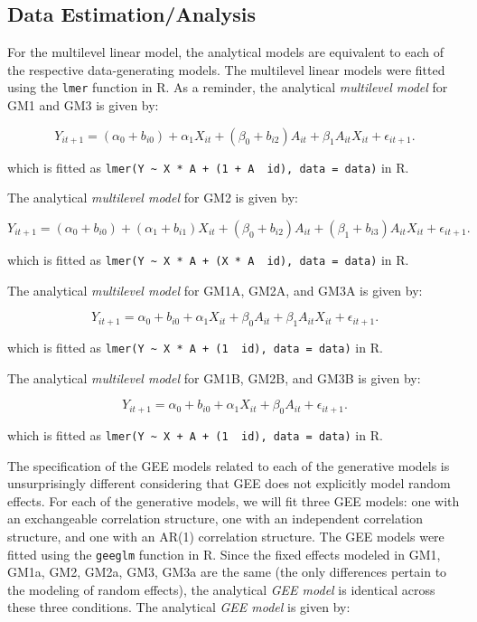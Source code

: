 \documentclass[
  12pt,
  a4paper,
]{article}
\begin{document}
\subsection{Data Estimation/Analysis}\label{data-estimationanalysis}

For the multilevel linear model, the analytical models are equivalent to
each of the respective data-generating models. The multilevel linear
models were fitted using the \texttt{lmer} function in R. As a reminder,
the analytical \emph{multilevel model} for GM1 and GM3 is given by:

\[
Y_{it+1} = (\alpha_0 + b_{i0}) + \alpha_1 X_{it} + (\beta_0 + b_{i2}) A_{it} + \beta_1 A_{it} X_{it} + \epsilon_{it+1}.
\]

which is fitted as
\texttt{lmer(Y\ \textasciitilde{}\ X\ *\ A\ +\ (1\ +\ A\ \textbar{}\ id),\ data\ =\ data)}
in R.

The analytical \emph{multilevel model} for GM2 is given by:

\[
Y_{it+1} = (\alpha_0 + b_{i0}) + (\alpha_1 + b_{i1}) X_{it} + (\beta_0 + b_{i2}) A_{it} + (\beta_1 + b_{i3}) A_{it} X_{it} + \epsilon_{it+1}.
\]

which is fitted as
\texttt{lmer(Y\ \textasciitilde{}\ X\ *\ A\ +\ (X\ *\ A\ \textbar{}\ id),\ data\ =\ data)}
in R.

The analytical \emph{multilevel model} for GM1A, GM2A, and GM3A is given
by:

\[
Y_{it+1} = \alpha_0 + b_{i0} + \alpha_1 X_{it} + \beta_0 A_{it} + \beta_1 A_{it} X_{it} + \epsilon_{it+1}.
\]

which is fitted as
\texttt{lmer(Y\ \textasciitilde{}\ X\ *\ A\ +\ (1\ \textbar{}\ id),\ data\ =\ data)}
in R.

The analytical \emph{multilevel model} for GM1B, GM2B, and GM3B is given
by:

\[
Y_{it+1} = \alpha_0 + b_{i0} + \alpha_1 X_{it} + \beta_0 A_{it} + \epsilon_{it+1}.
\]

which is fitted as
\texttt{lmer(Y\ \textasciitilde{}\ X\ +\ A\ +\ (1\ \textbar{}\ id),\ data\ =\ data)}
in R.

The specification of the GEE models related to each of the generative
models is unsurprisingly different considering that GEE does not
explicitly model random effects. For each of the generative models, we
will fit three GEE models: one with an exchangeable correlation
structure, one with an independent correlation structure, and one with
an AR(1) correlation structure. The GEE models were fitted using the
\texttt{geeglm} function in R. Since the fixed effects modeled in GM1,
GM1a, GM2, GM2a, GM3, GM3a are the same (the only differences pertain to
the modeling of random effects), the analytical \emph{GEE model} is
identical across these three conditions. The analytical \emph{GEE model}
is given by:
\end{document}

